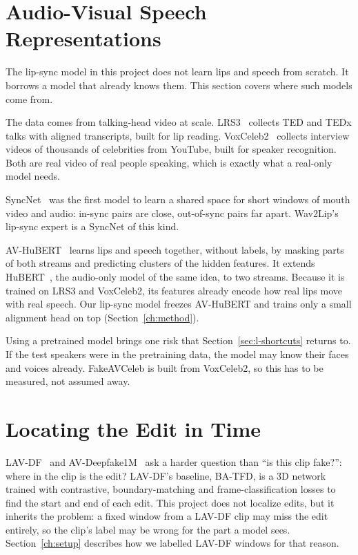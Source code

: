 \section{Audio-Visual Speech Representations}
\label{sec:l-avrep}

The lip-sync model in this project does not learn lips and speech from
scratch. It borrows a model that already knows them. This section covers
where such models come from.

The data comes from talking-head video at scale. LRS3~\cite{lrs3} collects
TED and TEDx talks with aligned transcripts, built for lip reading.
VoxCeleb2~\cite{voxceleb2} collects interview videos of thousands of
celebrities from YouTube, built for speaker recognition. Both are real video
of real people speaking, which is exactly what a real-only model needs.

SyncNet~\cite{syncnet} was the first model to learn a shared space for short
windows of mouth video and audio: in-sync pairs are close, out-of-sync pairs
far apart. Wav2Lip's lip-sync expert is a SyncNet of this kind.

AV-HuBERT~\cite{avhubert} learns lips and speech together, without labels, by
masking parts of both streams and predicting clusters of the hidden features.
It extends HuBERT~\cite{hubert}, the audio-only model of the same idea, to two
streams. Because it is trained on LRS3 and VoxCeleb2, its features already
encode how real lips move with real speech. Our lip-sync model freezes
AV-HuBERT and trains only a small alignment head on top
(Section~\ref{ch:method}).

Using a pretrained model brings one risk that Section~\ref{sec:l-shortcuts}
returns to. If the test speakers were in the pretraining data, the model may
know their faces and voices already. FakeAVCeleb is built from VoxCeleb2, so
this has to be measured, not assumed away.

\section{Locating the Edit in Time}

LAV-DF~\cite{lavdf} and AV-Deepfake1M~\cite{avdeepfake1m} ask a harder
question than ``is this clip fake?'': where in the clip is the edit? LAV-DF's
baseline, BA-TFD, is a 3D network trained with contrastive, boundary-matching
and frame-classification losses to find the start and end of each edit. This
project does not localize edits, but it inherits the problem: a fixed window
from a LAV-DF clip may miss the edit entirely, so the clip's label may be
wrong for the part a model sees. Section~\ref{ch:setup} describes how we
labelled LAV-DF windows for that reason.

